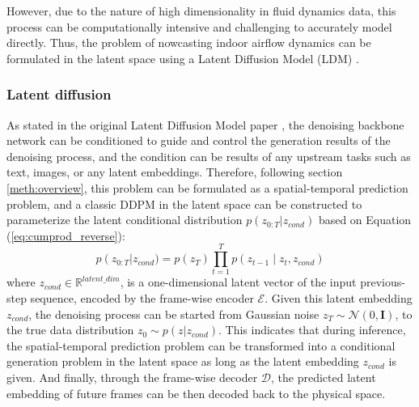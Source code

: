 \documentclass[final-report]{article-template}
\begin{document}
However, due to the nature of high dimensionality in fluid dynamics data, this process can be computationally intensive and challenging to accurately model directly. Thus, the problem of nowcasting indoor airflow dynamics can be formulated in the latent space using a Latent Diffusion Model (LDM) \cite{rombach2022highresolution}.

\subsubsection{Latent diffusion}
As stated in the original Latent Diffusion Model paper \cite{rombach2022highresolution}, the denoising backbone network can be conditioned to guide and control the generation results of the denoising process, and the condition can be results of any upstream tasks such as text, images, or any latent embeddings. Therefore, following section \ref{meth:overview}, this problem can be formulated as a spatial-temporal prediction problem, and a classic DDPM in the latent space can be constructed to parameterize the latent conditional distribution $p(z_{0:T} | z_{cond})$ based on Equation (\ref{eq:cumprod_reverse}):
\begin{equation}
    p\left(z_{0: T}\right|z_{cond}) = p\left(z_T\right) \prod_{t=1}^T p\left(z_{t-1} \mid z_t, z_{cond}\right)
\end{equation}
where $z_{cond} \in \mathbb{R}^{latent\_dim}$, is a one-dimensional latent vector of the input previous-step sequence, encoded by the frame-wise encoder $\mathcal{E}$. Given this latent embedding $z_{cond}$, the denoising process can be started from Gaussian noise $z_T \sim \mathcal{N}(0, \mathbf{I})$, to the true data distribution $z_0 \sim p(z | z_{cond})$. This indicates that during inference, the spatial-temporal prediction problem can be transformed into a conditional generation problem in the latent space as long as the latent embedding $z_{cond}$ is given. And finally, through the frame-wise decoder $\mathcal{D}$, the predicted latent embedding of future frames can be then decoded back to the physical space. \\
\end{document}
